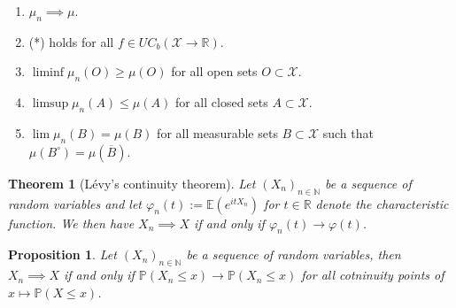 \documentclass[11pt,a4paper, final]{article}
\newtheorem{thm}{Theorem}[section]
\newtheorem{prop}{Proposition}[section]
\theoremstyle{definition}
\begin{document}
\begin{enumerate}
\item $\mu_n \implies \mu$.
\item (*) holds for all $f \in UC_b( \mathcal{X} \to \mathbb{R})$.
\item $\liminf \mu_n(O) \geq \mu (O)$ for all open sets $O \subset \mathcal{X}$. 
\item $\limsup \mu_n(A) \leq \mu (A)$ for all closed sets $A \subset \mathcal{X}$. 
\item $\lim \mu_n(B) = \mu(B)$ for all measurable sets $B \subset \mathcal{X}$ such that $\mu(B^\circ)= \mu( \overline{B})$. 
\end{enumerate}
\begin{thm}[Lévy's continuity theorem] Let $(X_n)_{n \in \mathbb{N}}$ be a sequence of random variables and let $\varphi_n(t):= \mathbb{E}(e^{itX_n})$ for $t \in \mathbb{R}$ denote the characteristic function. We then have $X_n \implies X$ if and only if $\varphi_n(t) \to \varphi(t)$. 

\end{thm}
\begin{prop} Let $(X_n)_{n \in \mathbb{N}}$ be a sequence of random variables, then $X_n \implies X$ if and only if $\mathbb{P}(X_n \leq x) \to \mathbb{P}(X_n \leq x)$ for all cotninuity points of $x \mapsto \mathbb{P}(X \leq x)$. 

\end{prop}

\newpage
\end{document}
